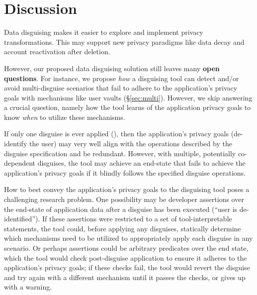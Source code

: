 \section{Discussion}
Data disguising makes it easier to explore and implement privacy transformations. This may support
new privacy paradigms like data decay and account reactivation after deletion.

However, our proposed data disguising solution still leaves many \textbf{open questions}. 
%
For instance, we propose \emph{how} a disguising tool can detect and/or avoid multi-disguise
scenarios that fail to adhere to the application's privacy goals with mechanisms like user vaults (\S\ref{sec:multi}).
However, we skip answering a crucial question, namely how the tool learns of the application
privacy goals to know \emph{when} to utilize these mechanisms.

If only one disguise is ever applied (\eg \gdpr), then the application's
privacy goals (\eg de-identify the user) may very well align with the operations described by the
disguise specification and be redundant.  However, with multiple, potentially co-dependent disguises,
the tool may achieve an end-state that fails to achieve the application's privacy goals if it
blindly follows the specified disguise operations.

How to best convey the application's privacy goals to the disguising tool poses a challenging
research problem. One possibility may be developer assertions over the end-state of application data
after a disguise has been executed (\eg ``user is de-identified''). If these assertions were
restricted to a set of tool-interpretable statements, the tool could, before applying any disguises,
statically determine which mechanisms need to be utilized to appropriately apply each disguise in
any scenario.  Or perhaps assertions could be arbitrary predicates over the end state, which the
tool would check post-disguise application to ensure it adheres to the application's privacy goals;
if these checks fail, the tool would revert the disguise and try again with a different mechanism
until it passes the checks, or gives up with a warning.

